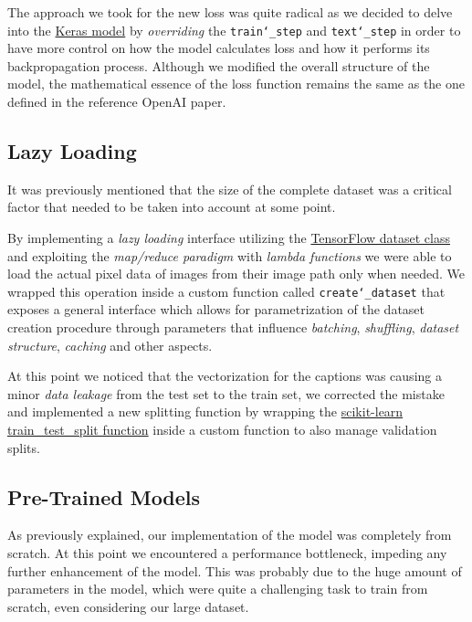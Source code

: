\documentclass[10pt,twocolumn,letterpaper]{article}
\begin{document}
The approach we took for the new loss was quite radical as we decided to delve into the \href{https://www.tensorflow.org/api_docs/python/tf/keras/Model}{Keras model} by \textit{overriding} the \texttt{train\char`_step} and \texttt{text\char`_step} in order to have more control on how the model calculates loss and how it performs its backpropagation process.
Although we modified the overall structure of the model, the mathematical essence of the loss function remains the same as the one defined in the reference OpenAI paper.

\subsection{Lazy Loading}
It was previously mentioned that the size of the complete dataset was a critical factor that needed to be taken into account at some point.

By implementing a \textit{lazy loading} interface utilizing the \href{https://www.tensorflow.org/api_docs/python/tf/data/Dataset}{TensorFlow dataset class} and exploiting the \textit{map/reduce paradigm} with \textit{lambda functions} we were able to load the actual pixel data of images from their image path only when needed.
We wrapped this operation inside a custom function called \texttt{create\char`_dataset} that exposes a general interface which allows for parametrization of the dataset creation procedure through parameters that influence \textit{batching}, \textit{shuffling}, \textit{dataset structure}, \textit{caching} and other aspects.

At this point we noticed that the vectorization for the captions was causing a minor \textit{data leakage} from the test set to the train set, we corrected the mistake and implemented a new splitting function by wrapping the \href{https://scikit-learn.org/stable/modules/generated/sklearn.model_selection.train_test_split.html}{scikit-learn train\_test\_split function} inside a custom function to also manage validation splits.

\subsection{Pre-Trained Models}
As previously explained, our implementation of the model was completely from scratch. At this point we encountered a performance bottleneck, impeding any further enhancement of the model. This was probably due to the huge amount of parameters in the model, which were quite a challenging task to train from scratch, even considering our large dataset.
\end{document}
